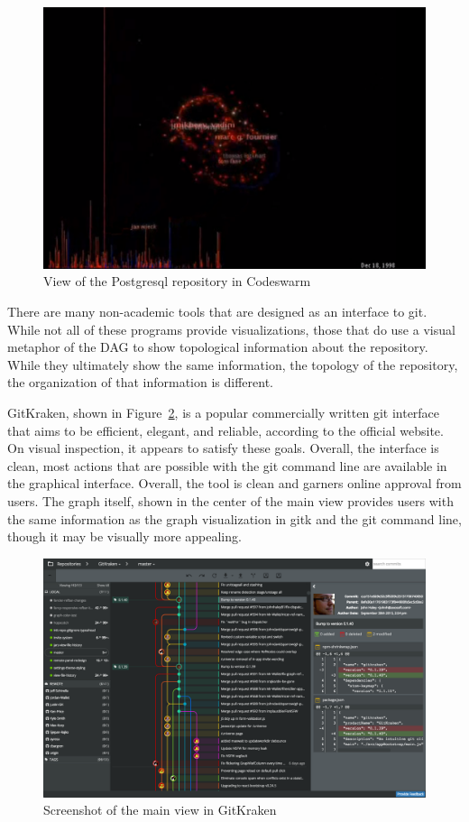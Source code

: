 \begin{figure}[htpb]
  \centering
  \includegraphics[width=0.8\linewidth]{Figures/introduction/codeswarm.png}
  \caption{View of the Postgresql repository in Codeswarm}
  \label{fig:codeswarm}
\end{figure}

There are many non-academic tools that are designed as an interface to
git. While not all of these programs provide visualizations, those that
do use a visual metaphor of the DAG to show topological information
about the repository. While they ultimately show the same information,
the topology of the repository, the organization of that information is
different.

GitKraken, shown in Figure~\ref{fig:gitkraken_main},  is a popular
commercially written git interface that aims to be efficient, elegant,
and reliable, according to the official website. On visual inspection,
it appears to satisfy these goals. Overall, the interface is clean, most
actions that are possible with the git command line are available in the
graphical interface. Overall, the tool is clean and garners online
approval from users. The graph itself, shown in the center of the main
view provides users with the same information as the graph visualization
in gitk and the git command line, though it may be visually more
appealing.

\begin{figure}[htpb]
  \centering
  \includegraphics[width=0.8\linewidth]{Figures/introduction/gitkraken_main.png}
  \caption{Screenshot of the main view in GitKraken}
  \label{fig:gitkraken_main}
\end{figure}

